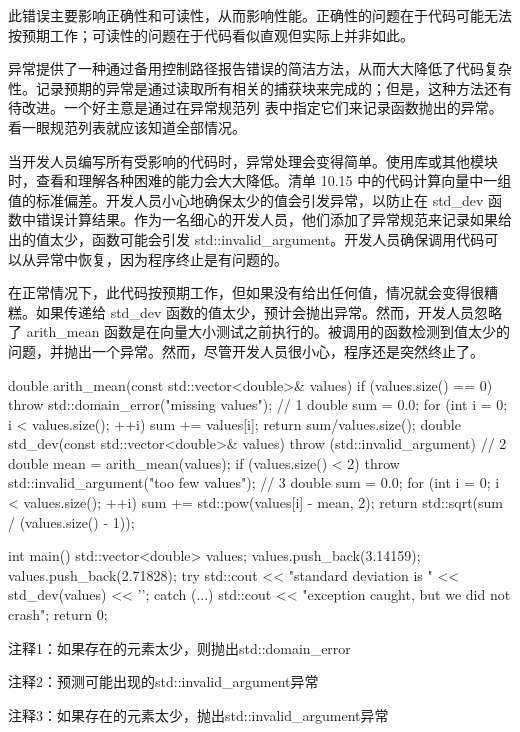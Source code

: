 此错误主要影响正确性和可读性，从而影响性能。正确性的问题在于代码可能无法按预期工作；可读性的问题在于代码看似直观但实际上并非如此。

异常提供了一种通过备用控制路径报告错误的简洁方法，从而大大降低了代码复杂性。记录预期的异常是通过读取所有相关的捕获块来完成的；但是，这种方法还有待改进。一个好主意是通过在异常规范列 表中指定它们来记录函数抛出的异常。看一眼规范列表就应该知道全部情况。


当开发人员编写所有受影响的代码时，异常处理会变得简单。使用库或其他模块时，查看和理解各种困难的能力会大大降低。清单 10.15 中的代码计算向量中一组值的标准偏差。开发人员小心地确保太少的值会引发异常，以防止在 std\_dev 函数中错误计算结果。作为一名细心的开发人员，他们添加了异常规范来记录如果给出的值太少，函数可能会引发 std::invalid\_argument。开发人员确保调用代码可以从异常中恢复，因为程序终止是有问题的。

在正常情况下，此代码按预期工作，但如果没有给出任何值，情况就会变得很糟糕。如果传递给 std\_dev 函数的值太少，预计会抛出异常。然而，开发人员忽略了 arith\_mean 函数是在向量大小测试之前执行的。被调用的函数检测到值太少的问题，并抛出一个异常。然而，尽管开发人员很小心，程序还是突然终止了。


\begin{cpp}
double arith_mean(const std::vector<double>& values) {
  if (values.size() == 0)
    throw std::domain_error("missing values"); // 1
  double sum = 0.0;
  for (int i = 0; i < values.size(); ++i)
    sum += values[i];
  return sum/values.size();
}
double std_dev(const std::vector<double>& values)
                throw (std::invalid_argument) { // 2
  double mean = arith_mean(values);
  if (values.size() < 2)
    throw std::invalid_argument("too few values"); // 3
  double sum = 0.0;
  for (int i = 0; i < values.size(); ++i)
    sum += std::pow(values[i] - mean, 2);
  return std::sqrt(sum / (values.size() - 1));
}

int main() {
  std::vector<double> values;
  values.push_back(3.14159);
  values.push_back(2.71828);
  try {
    std::cout << "standard deviation is " << std_dev(values) << '\n';
  } catch (...) {
    std::cout << "exception caught, but we did not crash\n";
  }
  return 0;
}
\end{cpp}

{\footnotesize
注释1：如果存在的元素太少，则抛出std::domain\_error

注释2：预测可能出现的std::invalid\_argument异常

注释3：如果存在的元素太少，抛出std::invalid\_argument异常
}

